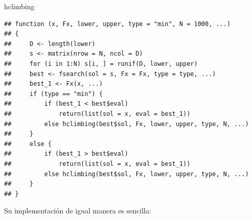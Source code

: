 \documentclass[11pt,]{article}
\newenvironment{Shaded}{\begin{snugshade}}{\end{snugshade}}
\newcommand{\CharTok}[1]{\textcolor[rgb]{0.31,0.60,0.02}{#1}}
\newcommand{\CommentTok}[1]{\textcolor[rgb]{0.56,0.35,0.01}{\textit{#1}}}
\newcommand{\DataTypeTok}[1]{\textcolor[rgb]{0.13,0.29,0.53}{#1}}
\newcommand{\DecValTok}[1]{\textcolor[rgb]{0.00,0.00,0.81}{#1}}
\newcommand{\KeywordTok}[1]{\textcolor[rgb]{0.13,0.29,0.53}{\textbf{#1}}}
\newcommand{\NormalTok}[1]{#1}
\newcommand{\OperatorTok}[1]{\textcolor[rgb]{0.81,0.36,0.00}{\textbf{#1}}}
\newcommand{\StringTok}[1]{\textcolor[rgb]{0.31,0.60,0.02}{#1}}
\begin{document}
\begin{Shaded}
\begin{Highlighting}[]
\NormalTok{hclimbing}
\end{Highlighting}
\end{Shaded}

\begin{verbatim}
## function (x, Fx, lower, upper, type = "min", N = 1000, ...) 
## {
##     D <- length(lower)
##     s <- matrix(nrow = N, ncol = D)
##     for (i in 1:N) s[i, ] = runif(D, lower, upper)
##     best <- fsearch(sol = s, Fx = Fx, type = type, ...)
##     best_1 <- Fx(x, ...)
##     if (type == "min") {
##         if (best_1 < best$eval) 
##             return(list(sol = x, eval = best_1))
##         else hclimbing(best$sol, Fx, lower, upper, type, N, ...)
##     }
##     else {
##         if (best_1 > best$eval) 
##             return(list(sol = x, eval = best_1))
##         else hclimbing(best$sol, Fx, lower, upper, type, N, ...)
##     }
## }
\end{verbatim}

Su implementación de igual manera es sencilla:

\begin{Shaded}
\end{Shaded}
\end{document}
